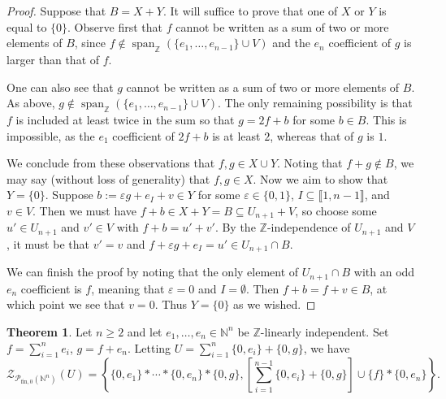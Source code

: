 \documentclass{report}
\newcommand{\NN}{\mathbb{N}}
\renewcommand{\P}{\mathcal{P}}
\newcommand{\ZZ}{\mathbb{Z}}
\newcommand{\Z}{\mathcal{Z}}
\newcommand{\llb}{\llbracket}
\newcommand{\rrb}{\rrbracket}
\newcommand{\fon}{{\textrm{fin}, 0}}
\renewcommand{\:}{\text{:}}
\theoremstyle{definition}
\newtheorem{thm}[defn]{Theorem}
\begin{document}
\begin{proof}
Suppose that $B = X + Y$.
It will suffice to prove that one of $X$ or $Y$ is equal to $\{0\}$.
Observe first that $f$ cannot be written as a sum of two or more elements of $B$, since $f\notin \operatorname{span}_\ZZ (\{e_1,\dots, e_{n-1}\}\cup V)$ and the $e_n$ coefficient of $g$ is larger than that of $f$.

One can also see that $g$ cannot be written as a sum of two or more elements of $B$.
As above, $g\notin \operatorname{span}_\ZZ (\{e_1,\dots, e_{n-1}\}\cup V)$.
The only remaining possibility is that $f$ is included at least twice in the sum so that $g = 2f + b$ for some $b\in B$.
This is impossible, as the $e_1$ coefficient of $2f+b$ is at least $2$, whereas that of $g$ is $1$.

We conclude from these observations that $f,g\in X \cup Y$.
Noting that $f+g \notin B$, we may say (without loss of generality) that $f,g\in X$.
Now we aim to show that $Y = \{0\}$.
Suppose $b := \varepsilon g + e_I +v \in Y$ for some $\varepsilon \in \{0,1\}$, $I\subseteq \llb 1,n-1\rrb$, and $v\in V$.
Then we must have $f + b \in X+Y = B \subseteq U_{n+1} + V$, so choose some $u'\in U_{n+1}$ and $v'\in V$ with $f + b = u' + v'$.
By the $\ZZ$-independence of $U_{n+1}$ and $V$, it must be that $v' = v$ and $f + \varepsilon g + e_I = u' \in U_{n+1} \cap B$.

We can finish the proof by noting that the only element of $U_{n+1}\cap B$ with an odd $e_n$ coefficient is $f$, meaning that $\varepsilon=0$ and $I = \emptyset$.
Then $f+b = f+v \in B$, at which point we see that $v = 0$.
Thus $Y = \{0\}$ as we wished.
\end{proof}

\begin{thm} \label{thm:2n-length-set}
Let $n\ge 2$ and let $e_1,\dots, e_n\in \NN^n$ be $\ZZ$-linearly independent.
Set $f = \sum_{i=1}^n e_i$, $g=f+e_n$.
Letting $U = \sum_{i=1}^n \{0,e_i\} + \{0,g\}$, we have 
\[\Z_{\P_\fon(\NN^n)}(U) = \left\{ \{0,e_1\}*\cdots*\{0,e_n\}*\{0,g\}, \left[\sum_{i=1}^{n-1}\{0,e_i\}+\{0,g\}\right]\cup\{f\} * \{0,e_n\} \right\}. \]
\end{thm}
\end{document}
